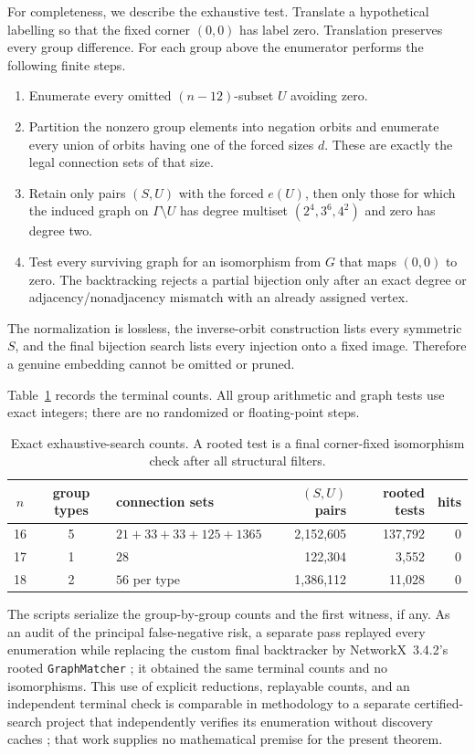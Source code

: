 \documentclass[11pt]{article}
\begin{document}
For completeness, we describe the exhaustive test.  Translate a
hypothetical labelling so that the fixed corner $(0,0)$ has label zero.
Translation preserves every group difference.  For each group above the
enumerator performs the following finite steps.
\begin{enumerate}
\item Enumerate every omitted $(n-12)$-subset $U$ avoiding zero.
\item Partition the nonzero group elements into negation orbits and
      enumerate every union of orbits having one of the forced sizes $d$.
      These are exactly the legal connection sets of that size.
\item Retain only pairs $(S,U)$ with the forced $e(U)$, then only those
      for which the induced graph on $\Gamma\setminus U$ has degree
      multiset $(2^4,3^6,4^2)$ and zero has degree two.
\item Test every surviving graph for an isomorphism from $G$ that maps
      $(0,0)$ to zero.  The backtracking rejects a partial bijection only
      after an exact degree or adjacency/nonadjacency mismatch with an
      already assigned vertex.
\end{enumerate}
The normalization is lossless, the inverse-orbit construction lists
every symmetric $S$, and the final bijection search lists every injection
onto a fixed image.  Therefore a genuine embedding cannot be omitted or
pruned.

Table~\ref{tab:counts} records the terminal counts.  All group arithmetic
and graph tests use exact integers; there are no randomized or
floating-point steps.
\begin{table}[ht]
\centering
\begin{tabular}{@{}cclrrr@{}}
\toprule
$n$ & group types & connection sets & $(S,U)$ pairs & rooted tests & hits\\
\midrule
16 & 5 & $21+33+33+125+1365$ & 2,152,605 & 137,792 & 0\\
17 & 1 & $28$ & 122,304 & 3,552 & 0\\
18 & 2 & $56$ per type & 1,386,112 & 11,028 & 0\\
\bottomrule
\end{tabular}
\caption{Exact exhaustive-search counts.  A rooted test is a final
corner-fixed isomorphism check after all structural filters.}
\label{tab:counts}
\end{table}

The scripts serialize the group-by-group counts and the first witness, if
any.  As an audit of the principal false-negative risk, a separate pass
replayed every enumeration while replacing the custom final backtracker
by NetworkX~3.4.2's rooted \texttt{GraphMatcher}
\cite{HagbergSchultSwart2008}; it obtained the same terminal counts and
no isomorphisms.  This use of explicit reductions, replayable
counts, and an independent terminal check is comparable in methodology
to a separate certified-search project that independently verifies its
enumeration without discovery caches \cite{Zeng2026Figshare33318282}; that
work supplies no mathematical premise for the present theorem.
\end{document}
